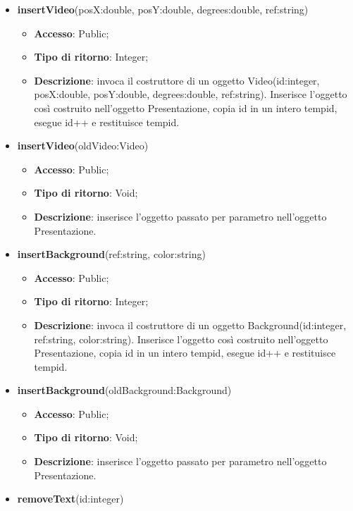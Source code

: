 {{\begin{itemize}
\begin{itemize}
				\item \textbf{Descrizione}: inserisce l’oggetto passato per parametro nell’oggetto Presentazione.
			\end{itemize}
			\item \textbf{insertVideo}(posX:double, posY:double, degrees:double, ref:string)
			\begin{itemize}
				\item \textbf{Accesso}: Public;
				\item \textbf{Tipo di ritorno}: Integer;
				\item \textbf{Descrizione}: invoca il costruttore di un oggetto Video(id:integer, posX:double, posY:double, degrees:double, ref:string). Inserisce l’oggetto così costruito nell’oggetto Presentazione, copia id in un intero tempid, esegue id++ e restituisce tempid.
			\end{itemize}
			\item \textbf{insertVideo}(oldVideo:Video)
			\begin{itemize}
				\item \textbf{Accesso}: Public;
				\item \textbf{Tipo di ritorno}: Void;
				\item \textbf{Descrizione}: inserisce l’oggetto passato per parametro nell’oggetto Presentazione.
			\end{itemize}
			\item \textbf{insertBackground}(ref:string, color:string)
			\begin{itemize}
				\item \textbf{Accesso}: Public;
				\item \textbf{Tipo di ritorno}: Integer;
				\item \textbf{Descrizione}: invoca il costruttore di un oggetto Background(id:integer, ref:string, color:string). Inserisce l’oggetto così costruito nell’oggetto Presentazione, copia id in un intero tempid, esegue id++ e restituisce tempid.
			\end{itemize}
			\item \textbf{insertBackground}(oldBackground:Background)
			\begin{itemize}
				\item \textbf{Accesso}: Public;
				\item \textbf{Tipo di ritorno}: Void;
				\item \textbf{Descrizione}: inserisce l’oggetto passato per parametro nell’oggetto Presentazione.
			\end{itemize}
			\item \textbf{removeText}(id:integer)

\end{itemize}}}
